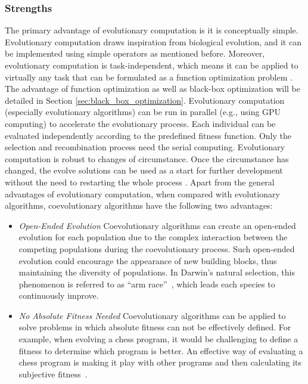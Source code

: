 \subsubsection{Strengths}

The primary advantage of evolutionary computation is it is conceptually simple. Evolutionary computation draws inspiration from biological evolution, and it can be implemented using simple operators as mentioned before. Moreover, evolutionary computation is task-independent, which means it can be applied to virtually any task that can be formulated as a function optimization problem \cite{Fogel:1997}. The advantage of function optimization as well as black-box optimization will be detailed in Section \ref{sec:black_box_optimization}. Evolutionary computation (especially evolutionary algorithms) can be run in parallel (e.g., using GPU computing) to accelerate the evolutionary process. Each individual can be evaluated independently according to the predefined fitness function. Only the selection and recombination process need the serial computing. Evolutionary computation is robust to changes of circumstance. Once the circumstance has changed, the evolve solutions can be used as a start for further development without the need to restarting the whole process \cite{Hornby2011}. Apart from the general advantages of evolutionary computation, when compared with evolutionary algorithms, coevolutionary algorithms have the following two advantages:

\begin{itemize}
\item \textit{Open-Ended Evolution} Coevolutionary algorithms can create an open-ended evolution for each population due to the complex interaction between the competing populations during the coevolutionary process. Such open-ended evolution could encourage the appearance of new building blocks, thus maintaining the diversity of populations. In Darwin's natural selection, this phenomenon is referred to as ``arm race''~\cite{Dawkins_1979}, which leads each species to continuously improve.  

\item \textit{No Absolute Fitness Needed} Coevolutionary algorithms can be applied to solve problems in which absolute fitness can not be effectively defined. For example, when evolving a chess program, it would be challenging to define a fitness to determine which program is better. An effective way of evaluating a chess program is making it play with other programs and then calculating its subjective fitness~\cite{Angeline_1993, David2014}. 
\end{itemize}

